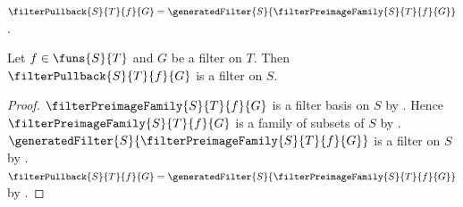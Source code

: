 \begin{definition}\label{filter_pullback}
    $\filterPullback{S}{T}{f}{G}
        =\generatedFilter{S}{\filterPreimageFamily{S}{T}{f}{G}}$.
\end{definition}

\begin{proposition}\label{filter_pullback_is_filter}
    Let $f\in\funs{S}{T}$ and $G$ be a filter on $T$.
    Then $\filterPullback{S}{T}{f}{G}$ is a filter on $S$.
\end{proposition}
\begin{proof}
    $\filterPreimageFamily{S}{T}{f}{G}$ is a filter basis on $S$ by
        .
    Hence $\filterPreimageFamily{S}{T}{f}{G}$ is a family of subsets of
        $S$ by .
    $\generatedFilter{S}{\filterPreimageFamily{S}{T}{f}{G}}$ is a filter
        on $S$ by .
    $\filterPullback{S}{T}{f}{G}
        =\generatedFilter{S}{\filterPreimageFamily{S}{T}{f}{G}}$ by
        .
\end{proof}

